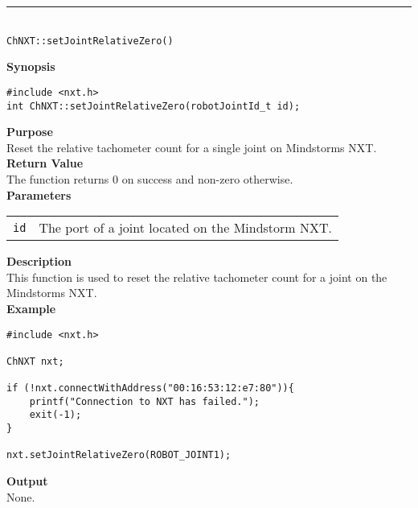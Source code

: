 \noindent
\vspace{5pt}
\rule{4.5in}{0.015in}\\
\noindent
{\LARGE \texttt{ChNXT::setJointRelativeZero()} }\\


\noindent
{\bf Synopsis}
\vspace{-8pt}
\begin{verbatim}
#include <nxt.h>
int ChNXT::setJointRelativeZero(robotJointId_t id);
\end{verbatim}

\noindent
{\bf Purpose}\\
Reset the relative tachometer count for a single joint on Mindstorms NXT.\\

\noindent
{\bf Return Value}\\
The function returns 0 on success and non-zero otherwise.\\

\noindent
{\bf Parameters}\\
\vspace{-0.1in}
\begin{description}
\item
\begin{tabular}{p{20mm}p{135mm}}
\texttt{id} &The port of a joint located on the Mindstorm NXT.\\
\end{tabular}
\end{description}

\noindent
{\bf Description}\\
This function is used to reset the relative tachometer count for a joint on the Mindstorms NXT.\\

\noindent
{\bf Example}
\begin{verbatim}
#include <nxt.h> 

ChNXT nxt;

if (!nxt.connectWithAddress("00:16:53:12:e7:80")){
    printf("Connection to NXT has failed.");
    exit(-1);
}
    
nxt.setJointRelativeZero(ROBOT_JOINT1);
\end{verbatim}

\noindent
{\bf Output}\\
None.\\
\\
